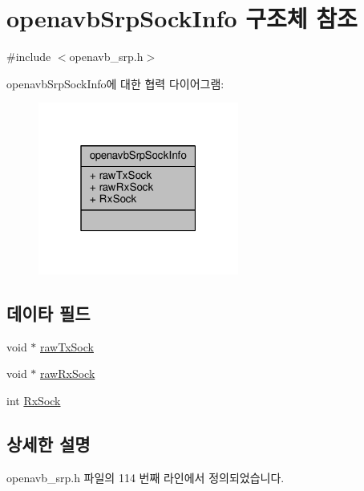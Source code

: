 \hypertarget{structopenavb_srp_sock_info}{}\section{openavb\+Srp\+Sock\+Info 구조체 참조}
\label{structopenavb_srp_sock_info}


{\ttfamily \#include $<$openavb\+\_\+srp.\+h$>$}



openavb\+Srp\+Sock\+Info에 대한 협력 다이어그램\+:
\nopagebreak
\begin{figure}[H]
\begin{center}
\leavevmode
\includegraphics[width=187pt]{structopenavb_srp_sock_info__coll__graph}
\end{center}
\end{figure}
\subsection*{데이타 필드}
\begin{DoxyCompactItemize}
\item 
void $\ast$ \hyperlink{structopenavb_srp_sock_info_afa78e0081e95ac5aefc91dbd6926ebf1}{raw\+Tx\+Sock}
\item 
void $\ast$ \hyperlink{structopenavb_srp_sock_info_a75adac221edbb38584cbc6bcb490c980}{raw\+Rx\+Sock}
\item 
int \hyperlink{structopenavb_srp_sock_info_a39ee207b080c577f803c932136fbf85f}{Rx\+Sock}
\end{DoxyCompactItemize}


\subsection{상세한 설명}


openavb\+\_\+srp.\+h 파일의 114 번째 라인에서 정의되었습니다.




